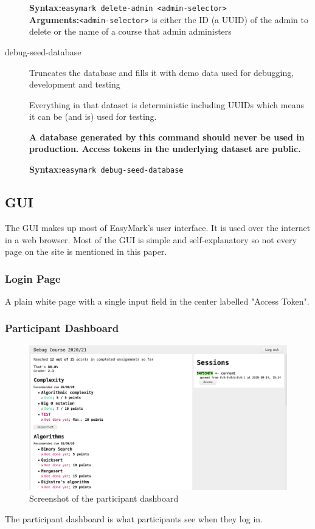 \documentclass[12pt,a4paper,oneside]{report}
\begin{document}
\begin{description}
		\textbf{Syntax:}\tabto{75pt}\lstinline|easymark delete-admin <admin-selector>|\\
		\textbf{Arguments:}\tabto{75pt}\lstinline|<admin-selector>| is either the ID (a UUID) of the admin to delete or the name of a course that admin administers

		\item[debug-seed-database] Truncates the database and fills it with demo data used for debugging, development and testing

		Everything in that dataset is deterministic including UUIDs which means it can be (and is) used for testing.

		\textbf{A database generated by this command should never be used in production. Access tokens in the underlying dataset are public.}

		\textbf{Syntax:}\tabto{75pt}\lstinline|easymark debug-seed-database|
	\end{description}

	\subsection{GUI}
	The GUI makes up most of EasyMark's user interface. It is used over the internet in a web browser. Most of the GUI is simple and self-explanatory so not every page on the site is mentioned in this paper.

	\subsubsection{Login Page}
	A plain white page with a single input field in the center labelled "Access Token".

	\subsubsection{Participant Dashboard}
	\begin{figure}[H]
		\includegraphics[width=\textwidth]{easymark_participant_dashboard.png}
		\vskip0pt
		\caption{Screenshot of the participant dashboard}
	\end{figure}
	The participant dashboard is what participants see when they log in.
\end{document}

